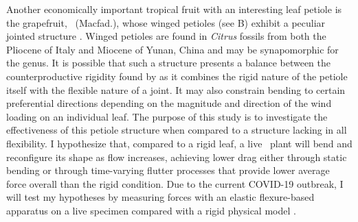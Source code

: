 Another economically important tropical fruit with an interesting leaf petiole is the grapefruit, \Citrusxparadisi\ (Macfad.), whose winged petioles (see B) exhibit a peculiar jointed structure \citep{morton1987grapefruit, kumamoto1987mystery, macfayden1837flora}. Winged petioles are found in \emph{Citrus} fossils from both the Pliocene of Italy \citep{fischer1998citrus} and Miocene of Yunan, China \citep{xie2013citrus} and may be synapomorphic for the genus. It is possible that such a structure presents a balance between the counterproductive rigidity found by \citet{miller2012reconfiguration} as it combines the rigid nature of the petiole itself with the flexible nature of a joint. It may also constrain bending to certain preferential directions depending on the magnitude and direction of the wind loading on an individual leaf. The purpose of this study is to investigate the effectiveness of this petiole structure when compared to a structure lacking in all flexibility. I hypothesize that, compared to a rigid leaf, a live \Cxparadisi\ plant will bend and reconfigure its shape as flow increases, achieving lower drag either through static bending or through time-varying flutter processes that provide lower average force overall than the rigid condition. Due to the current COVID-19 outbreak, I will test my hypotheses by measuring forces with an elastic flexure-based apparatus \citep{denny1983simple, bell1984quantifying} on a live specimen compared with a rigid physical model \citep{stevenson2015when, evangelista2014shifts, stewart2006hydrodynamic, vogel2009leaves}. 
